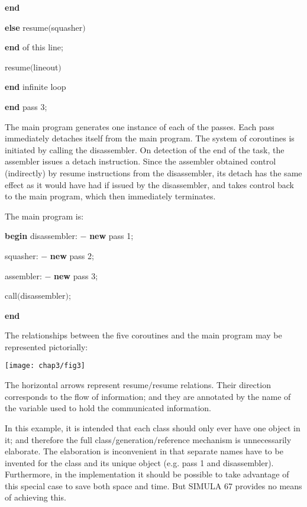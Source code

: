 \quad \quad \quad \quad \quad \quad \textbf{end}

\quad \quad \quad \quad \quad \quad \textbf{else} resume$($squasher$)$

\quad \quad \quad \quad \quad \quad \textbf{end} of this line;

\quad \quad \quad \quad resume$($lineout$)$

\quad \quad \quad \textbf{end} infinite loop

\quad \textbf{end} pass 3;

The main program generates one instance of each of the passes. Each pass immediately detaches itself from the main program. The system of coroutines is initiated by calling the disassembler. On detection of the end of the task, the assembler issues a detach instruction. Since the assembler obtained control (indirectly) by resume instructions from the disassembler, its detach has the same effect as it would have had if issued by the disassembler, and takes control back to the main program, which then immediately terminates.

The main program is:

\quad \textbf{begin} disassembler: $-$ \textbf{new} pass 1;

\quad \quad squasher: $-$ \textbf{new} pass 2;

\quad \quad assembler: $-$ \textbf{new} pass 3;

\quad \quad call$($disassembler$)$;

\quad \textbf{end}

The relationships between the five coroutines and the main program may be represented pictorially:
\begin{center}
	\texttt{[image: chap3/fig3]}
\end{center}

\noindent
The horizontal arrows represent resume$/$resume relations. Their direction corresponds to the flow of information; and they are annotated by the name of the variable used to hold the communicated information.

In this example, it is intended that each class should only ever have one object in it; and therefore the full class$/$generation$/$reference mechanism is unnecessarily elaborate. The elaboration is inconvenient in that separate names have to be invented for the class and its unique object (e.g. pass 1 and disassembler). Furthermore, in the implementation it should be possible to take advantage of this special case to save both space and time. But SIMULA 67 provides no means of achieving this.


